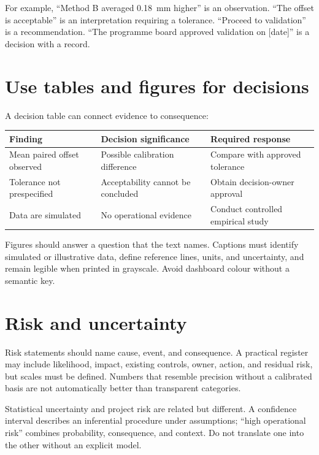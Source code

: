 For example, ``Method B averaged \SI{0.18}{\milli\metre} higher'' is an
observation. ``The offset is acceptable'' is an interpretation requiring a
tolerance. ``Proceed to validation'' is a recommendation. ``The programme board
approved validation on [date]'' is a decision with a record.

\section{Use tables and figures for decisions}

A decision table can connect evidence to consequence:

\begin{center}
\begin{tabularx}{\textwidth}{@{}p{}XX@{}}
  \toprule
  Finding & Decision significance & Required response \\
  \midrule
  Mean paired offset observed & Possible calibration difference & Compare with approved tolerance \\
  Tolerance not prespecified & Acceptability cannot be concluded & Obtain decision-owner approval \\
  Data are simulated & No operational evidence & Conduct controlled empirical study \\
  \bottomrule
\end{tabularx}
\end{center}

Figures should answer a question that the text names. Captions must identify
simulated or illustrative data, define reference lines, units, and uncertainty,
and remain legible when printed in grayscale. Avoid dashboard colour without a
semantic key.

\section{Risk and uncertainty}

Risk statements should name cause, event, and consequence. A practical register
may include likelihood, impact, existing controls, owner, action, and residual
risk, but scales must be defined. Numbers that resemble precision without a
calibrated basis are not automatically better than transparent categories.

Statistical uncertainty and project risk are related but different. A
confidence interval describes an inferential procedure under assumptions;
``high operational risk'' combines probability, consequence, and context. Do
not translate one into the other without an explicit model.

